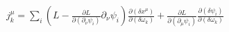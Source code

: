 \documentclass[preview]{standalone}
\begin{document}
\begin{align*}
j_{k}^{\mu}=\sum_i \left( L- \frac{\partial L}{\partial(\partial_{\nu}\psi_i)} \partial_{\nu}\psi_i\right)\frac{\partial(\delta x^{\mu})}{\partial (\delta \omega_k)}+\frac{\partial L}{\partial(\partial_{\mu}\psi_i)}\frac{\partial(\delta \psi_i)}{\partial(\delta \omega_k)}
\end{align*}
\end{document}
